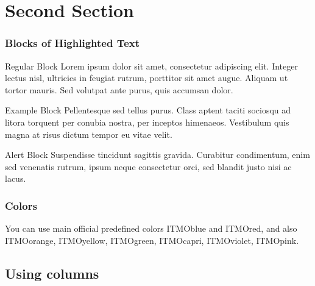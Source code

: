 \documentclass[aspectratio=169]{beamer}
\begin{document}
\section{Second Section} 

\begin{frame}
\frametitle{Blocks of Highlighted Text}
\begin{block}{Regular Block}
Lorem ipsum dolor sit amet, consectetur adipiscing elit. Integer lectus nisl, ultricies in feugiat rutrum, porttitor sit amet augue. Aliquam ut tortor mauris. Sed volutpat ante purus, quis accumsan dolor.
\end{block}

\begin{exampleblock}{Example Block}
Pellentesque sed tellus purus. Class aptent taciti sociosqu ad litora torquent per conubia nostra, per inceptos himenaeos. Vestibulum quis magna at risus dictum tempor eu vitae velit.
\end{exampleblock}

\begin{alertblock}{Alert Block}
Suspendisse tincidunt sagittis gravida. Curabitur condimentum, enim sed venenatis rutrum, ipsum neque consectetur orci, sed blandit justo nisi ac lacus.
\end{alertblock}
\end{frame}


\begin{frame}
\frametitle{Colors}

You can use main official predefined colors 
\textcolor{ITMOblue}{ITMOblue} and \textcolor{ITMOred}{ITMOred}, and also
 \textcolor{ITMOorange}{ITMOorange}, \textcolor{ITMOyellow}{ITMOyellow},  \textcolor{ITMOgreen}{ITMOgreen}, \textcolor{ITMOcapri}{ITMOcapri}, \textcolor{ITMOviolet}{ITMOviolet}, \textcolor{ITMOpink}{ITMOpink}.

\end{frame}



\subsection{Using columns}
\end{document}
